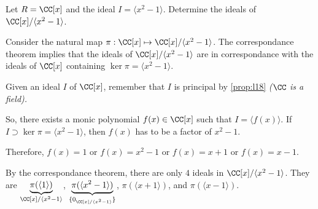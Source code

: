 \begin{exmp}
	Let $R = \CC[x]$ and the ideal $I = \langle x^2 - 1 \rangle$. Determine the ideals of $\CC[x]/ \langle x^2 - 1 \rangle$.

	Consider the natural map $\pi: \CC[x] \mapsto \CC[x]/ \langle x^2 - 1 \rangle$. The correspondance theorem implies that the ideals of $\CC[x]/ \langle x^2 - 1 \rangle$ are in correspondance with the ideals of $\CC[x]$ containing  $\ker \pi = \langle x^2 - 1 \rangle$.

	Given an ideal $I$ of $\CC[x]$, remember that $I$ is principal by \cref{prop:l18} \emph{($\CC$ is a field).}
	
	So, there exists a monic polynomial $f(x) \in \CC[x]$ such that $I = \langle f(x) \rangle$. If $I \supset \ker\pi = \langle x^2 - 1 \rangle$, then $f(x)$ has to be a factor of $x^2 - 1$. 

	Therefore, $f(x) = 1$ or $f(x) = x^2 - 1$ or $f(x) = x + 1$ or $f(x) = x - 1$.

	By the correspondance theorem, there are only $4$ ideals in $\CC[x]/ \langle x^2 - 1 \rangle$. They are $\underbrace{\pi( \langle 1 \rangle)}_{\CC[x]/ \langle x^2 - 1\rangle}$,  $\underbrace{\pi( \langle x^2 - 1 \rangle)}_{\{0_{\CC[x]/ \langle x^2 - 1 \rangle}\}}$, $\pi( \langle x + 1 \rangle)$, and $\pi( \langle x-1 \rangle)$.
\end{exmp}
